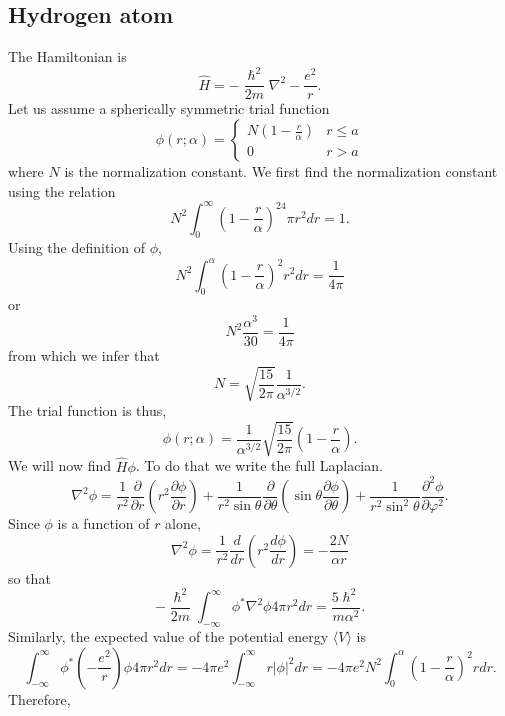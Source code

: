 \documentclass{article}
\numberwithin{equation}{section}
\begin{document}
\subsection{Hydrogen atom}
The Hamiltonian is
\begin{equation}\label{s5e34}
\hat{H} = -\frac{\hslash^2}{2m}\nabla^2 - \frac{e^2}{r}.
\end{equation}
Let us assume a spherically symmetric trial function
\begin{equation}\label{s5e35}
\phi(r; \alpha) = \begin{cases}
N\left(1 - \frac{r}{\alpha}\right) & r \le a \\
0 & r > a
\end{cases}
\end{equation}
where $N$ is the normalization constant. We first find the normalization 
constant using the relation
\[
N^2\int_0^\infty \left(1 - \frac{r}{\alpha}\right)^24\pi r^2dr = 1.
\]
Using the definition of $\phi$,
\[
N^2\int_0^\alpha\left(1 - \frac{r}{\alpha}\right)^2r^2dr = \frac{1}{4\pi}
\]
or
\[
N^2\frac{\alpha^3}{30} = \frac{1}{4\pi}
\]
from which we infer that
\begin{equation}\label{s5e36}
N = \sqrt{\frac{15}{2\pi}}\frac{1}{\alpha^{3/2}}.
\end{equation}
The trial function is thus,
\begin{equation}\label{s5e37}
\phi(r;\alpha) = \frac{1}{\alpha^{3/2}}\sqrt{\frac{15}{2\pi}}
\left(1-\frac{r}{\alpha}\right).
\end{equation}
We will now find $\hat{H}\phi$. To do that we write the full Laplacian.
\[
\nabla^2\phi = \frac{1}{r^2}\frac{\partial}{\partial r}\left(r^2\frac{
\partial\phi}{\partial r}\right) + \frac{1}{r^2\sin\theta}\frac{\partial}
{\partial\theta}\left(\sin\theta\frac{\partial\phi}{\partial\theta}
\right)+\frac{1}{r^2\sin^2\theta}\frac{\partial^2\phi}{\partial\varphi^2}.
\]
Since $\phi$ is a function of $r$ alone,
\[
\nabla^2\phi = \frac{1}{r^2}\frac{d}{dr}\left(r^2\frac{d\phi}{dr}\right)
= -\frac{2N}{\alpha r}
\]
so that
\begin{equation}\label{s5e38}
-\frac{\hslash^2}{2m}\int_{-\infty}^\infty\phi^\ast\nabla^2\phi 4\pi r^2dr
= \frac{5\hslash^2}{m\alpha^2}.
\end{equation}
Similarly, the expected value of the potential energy $\langle V \rangle$ is
\[
\int_{-\infty}^\infty\phi^\ast\left(-\frac{e^2}{r}\right)\phi 4\pi r^2dr = 
-4\pi e^2\int_{-\infty}^\infty r|\phi|^2dr = -4\pi e^2N^2\int_0^\alpha
\left(1 - \frac{r}{\alpha}\right)^2 r dr.
\]
Therefore,
\end{document}
